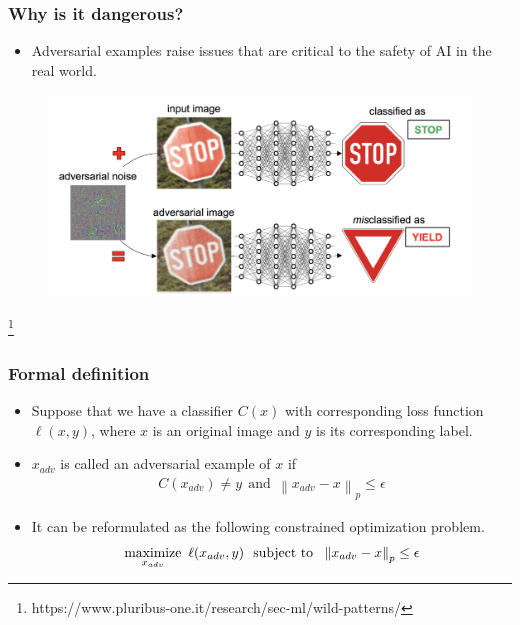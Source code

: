 \documentclass[10pt,mathserif]{beamer}
\newcommand\blfootnote[1]{%
  \begingroup
  \renewcommand\thefootnote{}\footnote{#1}%
  \addtocounter{footnote}{-1}%
  \endgroup
}
\newcommand{\norm}[1]{\left\lVert#1\right\rVert}
\begin{document}
\begin{frame}
\frametitle{Why is it dangerous?}
\vspace{1em}
\begin{itemize}\itemsep=12pt
    \item Adversarial examples raise issues that are critical to the safety of AI in the real world.
\end{itemize}
\vspace{-1em}
\begin{figure}
    \centering
    \includegraphics[scale=0.20]{figures/adversarial_example_stop_sign.png}
    \label{fig:adversarial_example}
\end{figure}
\blfootnote{\scriptsize https://www.pluribus-one.it/research/sec-ml/wild-patterns/}
\end{frame}

\begin{frame}
\frametitle{Formal definition}
\begin{itemize}\itemsep=12pt
    \item Suppose that we have a classifier $C(x)$ with corresponding loss function $\ell(x, y)$, where $x$ is an original image and $y$ is its corresponding label.\pause
    \item $x_{adv}$ is called an adversarial example of $x$ if
    \begin{align*}
    C(x_{adv}) \neq y ~~ \text{and} ~~ \norm{x_{adv}-x}_p \le \epsilon
    \end{align*}\pause
    \vspace{-1.5em}
    \item It can be reformulated as the following constrained optimization problem.
    \begin{align*}
    \maximize_{x_{adv}}~\ell(x_{adv}, y) ~~ \text{subject to} ~~ \norm{x_{adv}-x}_p \le \epsilon
    \end{align*}
    \vspace{-1.5em}
\end{itemize}
\end{frame}
\end{document}
